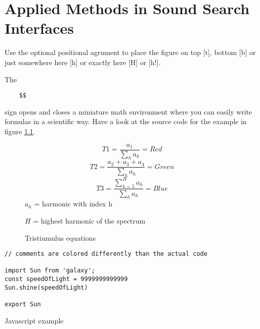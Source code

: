 \chapter{Applied Methods in Sound Search Interfaces}
\label{ch:relatedworks}


Use the optional positional agrument to place the figure on top [t], bottom [b] or just somewhere here [h] or exactly here [H] or [h!].

The \begin{verbatim}
	$$
\end{verbatim} sign opens and closes a miniature math environment where you can easily write formulas in a scientific way. Have a look at the source code for the example in figure \ref{fig:tristimequations}.


\begin{figure}[h]
$$
T1=\frac{a_1}{\sum_{h} a_h} = Red
$$
$$
T2 = \frac{a_2+a_3+a_4}{\sum_{h} a_h} = Green
$$
$$
T3=\frac{\sum_{h=5}^H a_h}{\sum_{h} a_h} = Blue
$$
$a_h$ = harmonic with index h

$H$ = highest harmonic of the spectrum
\caption{Tristiumulus equations}
\label{fig:tristimequations}
\end{figure}




\begin{listing}

\begin{verbatim}
// comments are colored differently than the actual code

import Sun from 'galaxy';
const speedOfLight = 9999999999999
Sun.shine(speedOfLight)

export Sun
\end{verbatim} 
\caption{Javascript example}
\label{lst:jsexample}
\end{listing}

